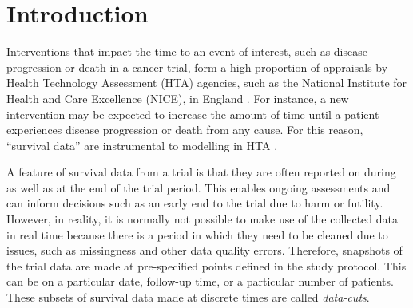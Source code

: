 \documentclass[AMA,STIX1COL]{WileyNJD-v2}
\begin{document}


\maketitle


\section{Introduction}\label{sec:intro}
Interventions that impact the time to an event of interest, such as disease progression or death in a cancer trial, form a high proportion of appraisals by Health Technology Assessment (HTA) agencies, such as the National Institute for Health and Care Excellence (NICE), in England \citep{Latimer2011}.
For instance, a new intervention may be expected to increase the amount of time until a patient experiences disease progression or death from any cause. For this reason, ``survival data'' are instrumental to modelling in HTA \cite{Demiris2006, Jackson2010}.

A feature of survival data from a trial is that they are often reported on during as well as at the end of the trial period.
This enables ongoing assessments and can inform decisions such as an early end to the trial due to harm or futility.
However, in reality, it is normally not possible to make use of the collected data in real time because there is a period in which they need to be cleaned due to issues, such as missingness and other data quality errors.
Therefore, snapshots of the trial data are made at pre-specified points defined in the study protocol.
This can be on a particular date, follow-up time, or a particular number of patients.
These subsets of survival data made at discrete times are called \textit{data-cuts}.
\end{document}
